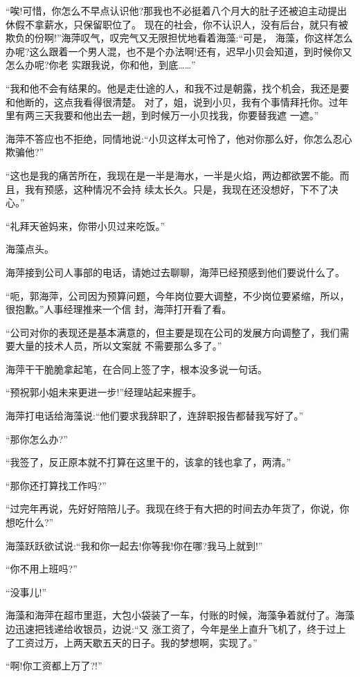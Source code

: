 \documentclass[11pt,a4paper,onecolumn]{article}
\begin{document}
``唉!可惜，你怎么不早点认识他?那我也不必挺着八个月大的肚子还被迫主动提出休假不拿薪水，只保留职位了。
现在的社会，你不认识人，没有后台，就只有被欺负的份啊!''海萍叹气，叹完气又无限担忧地看着海藻:``可是，
海藻，你这样怎么办呢?这么跟着一个男人混，也不是个办法啊!还有，迟早小贝会知道，到时候你又怎么办呢?你老
实跟我说，你和他，到底……''

``我和他不会有结果的。他是走仕途的人，和我不过是朝露，找个机会，我还是要和他断的，这点我看得很清楚。
对了，姐，说到小贝，我有个事情拜托你。过年里有两三天我要和他出去一趟，到时候万一小贝找我，你要替我遮
一遮。''

海萍不答应也不拒绝，同情地说:``小贝这样太可怜了，他对你那么好，你怎么忍心欺骗他?''

``这也是我的痛苦所在，我现在是一半是海水，一半是火焰，两边都欲罢不能。而且，我有预感，这种情况不会持
续太长久。只是，我现在还没想好，下不了决心。''

``礼拜天爸妈来，你带小贝过来吃饭。''

海藻点头。

海萍接到公司人事部的电话，请她过去聊聊，海萍已经预感到他们要说什么了。

``呃，郭海萍，公司因为预算问题，今年岗位要大调整，不少岗位要紧缩，所以，很抱歉。''人事经理推来一个信
封，海萍打开看了看。

``公司对你的表现还是基本满意的，但主要是现在公司的发展方向调整了，我们需要大量的技术人员，所以文案就
不需要那么多了。''

海萍干干脆脆拿起笔，在合同上签了字，根本没多说一句话。

``预祝郭小姐未来更进一步!''经理站起来握手。

海萍打电话给海藻说:``他们要求我辞职了，连辞职报告都替我写好了。''

``那你怎么办?''

``我签了，反正原本就不打算在这里干的，该拿的钱也拿了，两清。''

``那你还打算找工作吗?''

``过完年再说，先好好陪陪儿子。我现在终于有大把的时间去办年货了，你说，你想吃什么?''

海藻跃跃欲试说:``我和你一起去!你等我!你在哪?我马上就到!''

``你不用上班吗?''

``没事儿!''

海藻和海萍在超市里逛，大包小袋装了一车，付账的时候，海藻争着就付了。海藻边迅速把钱递给收银员，边说:``又
涨工资了，今年是坐上直升飞机了，终于过上了工资过万，上两天歇五天的日子。我的梦想啊，实现了。''

``啊!你工资都上万了?!''
\end{document}
